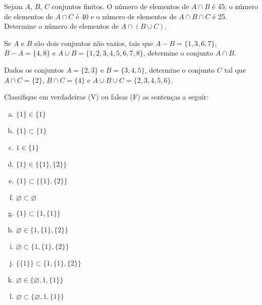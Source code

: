 \begin{secExercicios}
\begin{exer}
    Sejam $A$, $B$, $C$ conjuntos finitos. O número de elementos de $A\cap B$ é 45; o número de elementos de $A\cap C$ é 40 e o número de elementos de $A\cap B\cap C$ é 25. Determine o número de elementos de $A\cap (B\cup C)$.
\end{exer}

\begin{exer}
    Se $A$ e $B$ são dois conjuntos não vazios, tais que $A-B=\{1,3,6,7\}$, $B-A=\{4,8\}$ e $A\cup B= \{1,2,3,4,5,6,7,8\}$, determine o conjunto $A\cap B$.
\end{exer}

\begin{exer}
    Dados os conjuntos $A=\{2,3\}$ e $B=\{3,4,5\}$, determine o conjunto $C$ tal que $A\cap C = \{2\}$, $B\cap C=\{4\}$ e $A\cup B\cup C=\{2,3,4,5,6\}$.
\end{exer}

\begin{exer}
    Classifique em verdadeiras (V) ou falsas (F) as sentenças a seguir:
    \begin{enumerate}[a)]
        \item $\{1\}\in\{1\}$
        \item $\{1\}\subset\{1\}$
        \item $1\in\{1\}$
        \item $\{1\}\in\{\{1\},\{2\}\}$
        \item $\{1\}\subset\{\{1\},\{2\}\}$
        \item $\varnothing\subset \varnothing$
        \item $\{1\}\subset\{1,\{1\}\}$
        \item $\varnothing\in\{1,\{1\},\{2\}\}$
        \item $\varnothing\subset\{1,\{1\},\{2\}\}$
        \item $\{\{1\}\}\subset\{1,\{1\},\{2\}\}$
        \item $\varnothing\in\{\varnothing, 1,\{1\}\}$
        \item $\varnothing\subset\{\varnothing, 1,\{1\}\}$
    \end{enumerate}
\end{exer}



\end{secExercicios}